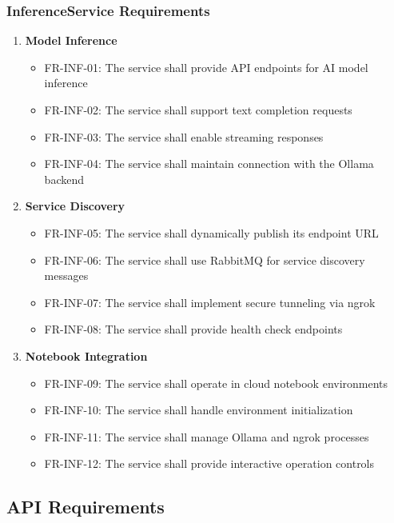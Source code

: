 \subsubsection*{InferenceService Requirements}

\begin{enumerate}
   \item \textbf{Model Inference}
   \begin{itemize}
      \item FR-INF-01: The service shall provide API endpoints for AI model inference
      \item FR-INF-02: The service shall support text completion requests
      \item FR-INF-03: The service shall enable streaming responses
      \item FR-INF-04: The service shall maintain connection with the Ollama backend
   \end{itemize}

   \item \textbf{Service Discovery}
   \begin{itemize}
      \item FR-INF-05: The service shall dynamically publish its endpoint URL
      \item FR-INF-06: The service shall use RabbitMQ for service discovery messages
      \item FR-INF-07: The service shall implement secure tunneling via ngrok
      \item FR-INF-08: The service shall provide health check endpoints
   \end{itemize}

   \item \textbf{Notebook Integration}
   \begin{itemize}
      \item FR-INF-09: The service shall operate in cloud notebook environments
      \item FR-INF-10: The service shall handle environment initialization
      \item FR-INF-11: The service shall manage Ollama and ngrok processes
      \item FR-INF-12: The service shall provide interactive operation controls
   \end{itemize}
\end{enumerate}

\subsection{API Requirements}

